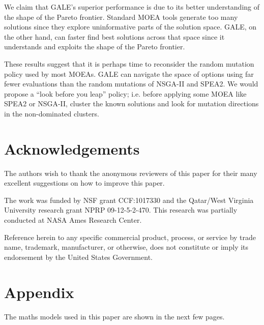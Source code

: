 \documentclass[10pt,journal,compsoc]{IEEEtran}
\newenvironment{changed}{\par}{\par}
\begin{document}
We claim that GALE's superior performance is due to
its better understanding of the shape of the Pareto
frontier.  Standard MOEA tools generate too many
solutions since they explore uninformative parts of
the solution space.  GALE, on the other hand, can
faster find best solutions across that space since
it understands and exploits the shape of the Pareto
frontier.


These results suggest that it is perhaps time to reconsider the random
mutation policy used by most MOEAs.  GALE can navigate the space of
options using far fewer evaluations than the random mutations of
NSGA-II and SPEA2. We would propose a ``look before you leap'' policy;
i.e. before applying some MOEA like SPEA2 or NSGA-II, cluster the
known solutions and look for mutation directions in the non-dominated
clusters.

   


\section*{Acknowledgements}
\begin{changed}
The authors wish to thank the anonymous reviewers of this
paper for their many excellent suggestions on how to improve this paper.
\end{changed}
The work was funded by NSF grant CCF:1017330 and the
Qatar/West Virginia University research grant NPRP
09-12-5-2-470.  This research was partially
conducted at NASA Ames Research Center. 

Reference
herein to any specific commercial product, process,
or service by trade name, trademark, manufacturer,
or otherwise, does not constitute or imply its endorsement by the United States Government.


    

\section*{Appendix}
The maths models used in this paper are shown in the next few pages.
\color{black}
\end{document}
